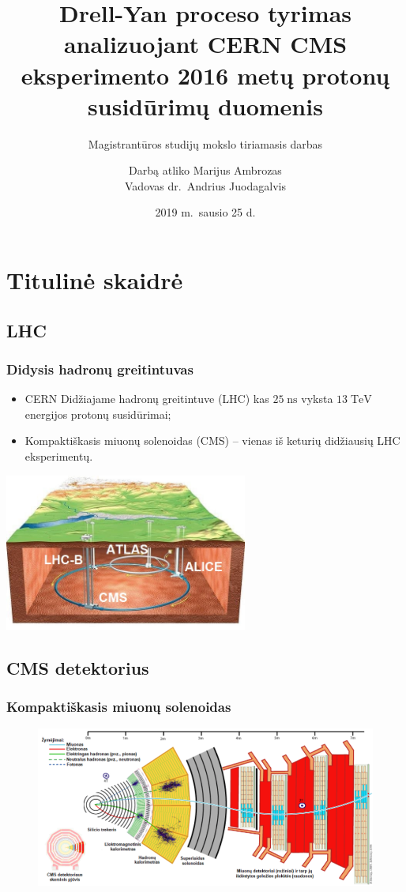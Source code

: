 \documentclass[xcolor=dvipsnames]{beamer}
\title[Drell-Yan proceso tyrimas]{Drell-Yan proceso tyrimas analizuojant CERN CMS eksperimento 2016 metų protonų susidūrimų duomenis}
\subtitle{Magistrantūros studijų mokslo tiriamasis darbas}
\author[M.\ Ambrozas]
{\color{VUwhite} Darbą atliko Marijus Ambrozas\\ Vadovas dr.\ Andrius Juodagalvis}
\institute[VU FF]
{\color{VUwhite} Vilniaus universitetas, Fizikos fakultetas}
\date[2019-01-25]{\color{VUwhite} 2019 m.\ sausio 25 d.}
\begin{document}
{
\section{Titulinė skaidrė}
\begin{frame}[plain]
	\titlepage
\end{frame}
}

\begin{frame}
	\section{LHC}
	\frametitle{Didysis hadronų greitintuvas}
	\begin{itemize}
		\item CERN Didžiajame hadronų greitintuve (LHC) kas $25 \; \mathrm{ns}$ vyksta $13 \; \mathrm{TeV}$ energijos protonų susidūrimai;
		\item Kompaktiškasis miuonų solenoidas (CMS) -- vienas iš keturių didžiausių LHC eksperimentų.
	\end{itemize}
	\centering
	\includegraphics[width=0.6\textwidth]{LHC.jpg}
\end{frame}


\begin{frame}
	\section{CMS detektorius}
	\frametitle{Kompaktiškasis miuonų solenoidas}
	\begin{figure}
		\includegraphics[width=\textwidth]{CMSslice_LT.png}
	\end{figure}
\end{frame}
\end{document}
